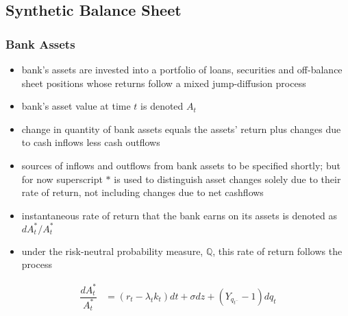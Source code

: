 \subsection{Synthetic Balance Sheet}
\subsubsection{Bank Assets}
\begin{itemize}
\item bank's assets are invested into a portfolio of loans, securities and off-balance sheet positions whose returns follow a mixed jump-diffusion process
\item bank's asset value at time $t$ is denoted $A_t$
\item change in quantity of bank assets equals the assets' return plus changes due to cash inflows less cash outflows
\item sources of inflows and outflows from bank assets to be specified shortly; but for now superscript $*$ is used to distinguish asset changes solely due to their rate of return, not including changes due to net cashflows
\item instantaneous rate of return that the bank earns on its assets is denoted as $d A_t^*/ A_t^*$
\item under the risk-neutral probability measure, $\mathbb{Q}$, this rate of return follows the process
\end{itemize}
\begin{align} \label{bankassetprocess}
\dfrac{d A_t^*}{A_t^*} &= \left( r_t - \lambda_t k_t \right) dt + \sigma dz + \left( Y_{q_{t^{-}}} -1\right) dq_t
\end{align}


